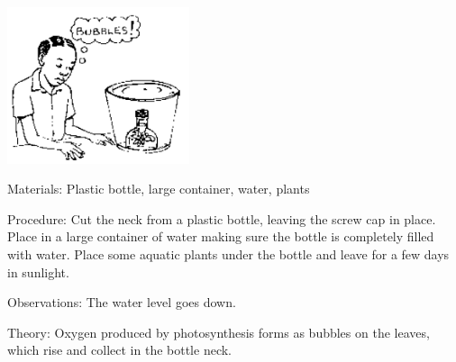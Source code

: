 \begin{multicols}{2}
\begin{center}
\includegraphics[width=0.4\textwidth]{./img/source/photo-gas.png}
\end{center}

\begin{description*}
\item[Materials:]{Plastic bottle, large container, water, plants}
\item[Procedure:]{Cut the neck from a plastic bottle, leaving the screw cap in place. Place in a large
container of water making sure the bottle is completely filled with water. Place some aquatic
plants under the bottle and leave for a few days in sunlight.}
\item[Observations:]{The water level goes down. }
\item[Theory:]{Oxygen produced by photosynthesis forms as bubbles on the
leaves, which rise and collect in the bottle neck.}
\end{description*}

%
%


\end{multicols}
